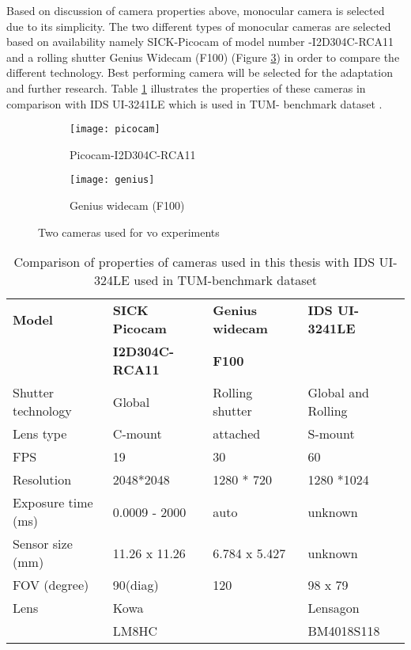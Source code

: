 \newline
Based on discussion of camera properties above, monocular camera is selected due to its simplicity. The two different types of monocular cameras are selected based on availability namely SICK-Picocam of model number -I2D304C-RCA11 and a rolling shutter Genius Widecam (F100)
(Figure \ref{fig:cameras_used}) in order to compare the different technology. Best performing camera will be selected for the adaptation and further research. Table \ref{table:camera_prop} illustrates the properties of these cameras in comparison with IDS UI-3241LE which is used in TUM- benchmark dataset \cite{photometrically}.
\begin{figure}[h!]
	\begin{subfigure}{.5\textwidth}
		\centering
		\texttt{[image: picocam]}
		\caption{Picocam-I2D304C-RCA11 \cite{picocam}}
		\label{fig:picocam}
	\end{subfigure}%
	\begin{subfigure}{.5\textwidth}
		\centering
		\texttt{[image: genius]}
		\caption{ Genius widecam (F100) \cite{genius}}
		\label{fig:webcam}
	\end{subfigure}
	\caption{Two cameras used for \acrshort{vo} experiments}
	\label{fig:cameras_used}
\end{figure}

\begin{table}[h!]
	\centering
	\begin{tabular}{ | l | l | l | l |}
		\hline
		\textbf{Model} & \textbf{SICK Picocam}  & \textbf{Genius widecam}  & \textbf{IDS UI-3241LE}  \\  
		              & \textbf{I2D304C-RCA11} & \textbf{F100} &  \\  
		\hline
		Shutter technology & Global & Rolling shutter & Global and Rolling \\ 
		\hline
		Lens type         & C-mount & attached        & S-mount \\ 
		\hline
		FPS               & 19      & 30              & 60\\ 
		\hline
		Resolution       & 2048*2048  &  1280 * 720   & 1280 *1024 \\
		 \hline
		Exposure time (ms) & 0.0009 - 2000 & auto &  unknown  \\
		 \hline
		Sensor size (mm) & 11.26 x 11.26 & 6.784 x 5.427 & unknown  \\
		 \hline
		FOV (degree) &  90(diag) &  120 & 98 x 79  \\
		 \hline
		Lens &  Kowa   &   & Lensagon \\
		     &  LM8HC  &   & BM4018S118  \\
		 \hline
	\end{tabular}
    \caption{Comparison of properties of cameras used in this thesis with IDS UI-324LE used in TUM-benchmark dataset}
    \label{table:camera_prop}
\end{table}
